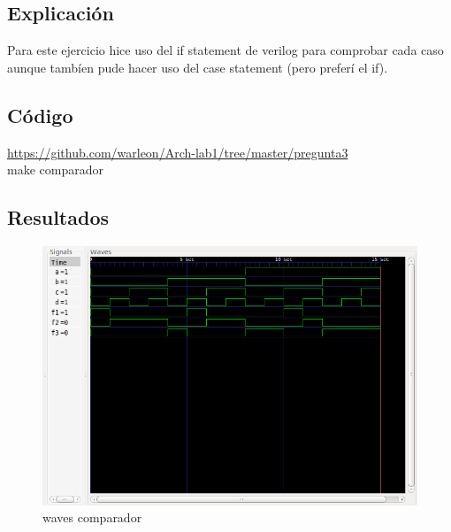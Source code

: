 \subsection*{Explicación}
Para este ejercicio hice uso del if statement de verilog para comprobar cada caso aunque tambíen pude hacer uso del case statement (pero preferí el if).
\subsection*{Código}
\faGithub \space
\href{https://github.com/warleon/Arch-lab1/tree/master/pregunta3}{https://github.com/warleon/Arch-lab1/tree/master/pregunta3}\\
make comparador




\subsection*{Resultados}
\begin{figure}[h]
    \centering
    \includegraphics[scale=0.6]{fotos/resultados/arki-COMPARADOR.png}
    \caption{waves comparador}
\end{figure}
